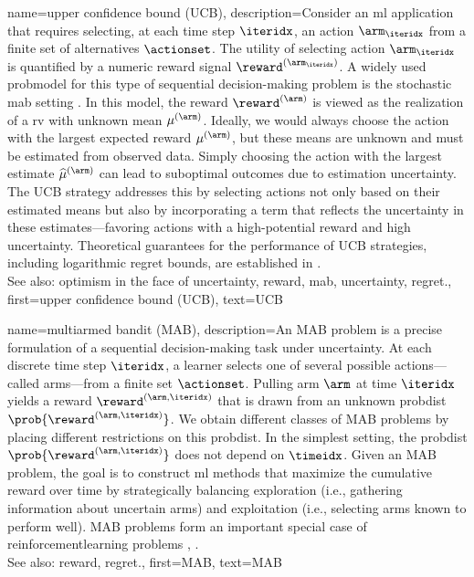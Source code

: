 {name={upper confidence bound (UCB)},
	description={Consider an \gls{ml} 
		application that requires selecting, at each time step $\iteridx$, an action $\arm_{\iteridx}$ 
		from a finite set of alternatives $\actionset$. The utility of selecting action $\arm_{\iteridx}$ 
		is quantified by a numeric \gls{reward} signal $\reward^{(\arm_{\iteridx})}$. 
		A widely used \gls{probmodel} for this type of sequential decision-making problem 
		is the \gls{stochastic} \gls{mab} setting \cite{Bubeck2012}. In this \gls{model}, 
		the \gls{reward} $\reward^{(\arm)}$ is viewed as the \gls{realization} of a \gls{rv} 
		with unknown \gls{mean} $\mu^{(\arm)}$. Ideally, we would always choose the 
		action with the largest expected \gls{reward} $\mu^{(\arm)}$, but these 
		\glspl{mean} are unknown and must be estimated from observed \gls{data}. Simply 
		choosing the action with the largest estimate $\widehat{\mu}^{(\arm)}$ can 
		lead to suboptimal outcomes due to estimation \gls{uncertainty}. The UCB strategy 
		addresses this by selecting actions not only based on their estimated \glspl{mean} but 
		also by incorporating a term that reflects the \gls{uncertainty} in these estimates—favoring 
		actions with a high-potential \gls{reward} and high \gls{uncertainty}. Theoretical guarantees 
		for the performance of UCB strategies, including logarithmic \gls{regret} bounds, are established in \cite{Bubeck2012}.
					\\ 
		See also: \gls{optimism in the face of uncertainty}, \gls{reward}, \gls{mab}, \gls{uncertainty}, \gls{regret}.},
	first={upper confidence bound (UCB)},
	text={UCB} 
}

{name={multiarmed bandit (MAB)},
	description={An MAB  problem is a precise 
	formulation of a sequential decision-making task under \gls{uncertainty}. At each 
	discrete time step $\iteridx$, a learner selects one of several possible 
	actions—called arms—from a finite set $\actionset$. Pulling arm $\arm$ at time 
	$\iteridx$ yields a \gls{reward} $\reward^{(\arm,\iteridx)}$ that is drawn from an unknown 
	\gls{probdist} $\prob{\reward^{(\arm,\iteridx)}}$. We obtain different classes 
	of MAB problems by placing different restrictions on this \gls{probdist}. In the simplest 
	setting, the \gls{probdist} $\prob{\reward^{(\arm,\iteridx)}}$ does not depend on $\timeidx$. 
		Given an MAB problem, the goal is to construct \gls{ml} methods that maximize the cumulative 
		\gls{reward} over time by strategically balancing exploration (i.e., gathering information 
		about uncertain arms) and exploitation (i.e., selecting arms known to perform well). 
		MAB problems form an important special case of \gls{reinforcementlearning} problems \cite{Bubeck2012}, \cite{SuttonEd2}.
					\\ 
		See also: \gls{reward}, \gls{regret}.},
	first={MAB},
	text={MAB}
}



